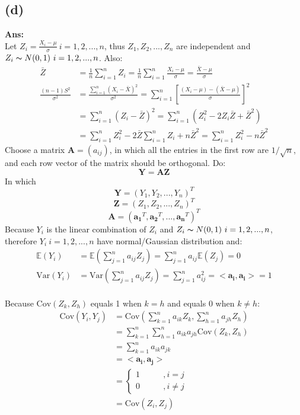 \documentclass[twoside]{homework}
\begin{document}
\subsection*{(d)}
\textbf{Ans:}\\
Let $Z_i = \frac{X_i -\mu}{\sigma}\ i=1,2,...,n$, thus $Z_1, Z_2,..., Z_n$ are independent and $Z_i\thicksim N(0,1)\ i=1,2,...,n$. Also:\\
\begin{equation}
    \begin{aligned}
    \bar{Z} &= \frac{1}{n}\sum_{i=1}^{n} Z_i = \frac{1}{n}\sum_{i=1}^{n} \frac{X_i -\mu}{\sigma} = \frac{\bar{X}-\mu}{\sigma}\\
    \frac{(n-1)S^2}{\sigma^2} &= \frac{\sum_{i=1}^{n} (X_i - \bar{X})^2}{\sigma^2} = \sum_{i=1}^{n} [\frac{ (X_i - \mu) - (\bar{X} - \mu)}{\sigma }]^2\\
    &= \sum_{i=1}^{n} (Z_i - \bar{Z})^2 = \sum_{i=1}^{n} (Z_i^2 - 2Z_i\bar{Z} + \bar{Z}^2)\\
    &= \sum_{i=1}^{n}Z_i^2 - 2\bar{Z}\sum_{i=1}^{n}Z_i + n\bar{Z}^2 = \sum_{i=1}^{n}Z_i^2 - n\bar{Z}^2
    \end{aligned}
\end{equation}
Choose a matrix $\bm{A} = (a_{ij})$, in which all the entries in the first row are $1/\sqrt{n}$, and each row vector of the matrix should be orthogonal. Do:\\
$$\bm{Y} = \bm{AZ}$$
In which $$\bm{Y} = (Y_1, Y_2,...,Y_n)^T$$ $$\bm{Z} = (Z_1, Z_2,...,Z_n)^T$$ $$\bm{A} = (\bm{a_1}^T, \bm{a_2}^T,...,\bm{a_n}^T)^T$$
Because $Y_i$ is the linear combination of $Z_i$ and $Z_i\thicksim N(0,1)\ i=1,2,...,n$, therefore $Y_i\ i=1,2,...,n$ have normal/Gaussian distribution and:
\begin{equation}
\begin{aligned}
\mathbb{E}(Y_i) &= \mathbb{E}(\sum_{j=1}^{n} a_{ij}Z_j) = \sum_{j=1}^{n} a_{ij}\mathbb{E}(Z_j) = 0\\
\mathrm{Var}(Y_i) &= \mathrm{Var}(\sum_{j=1}^{n} a_{ij}Z_j) = \sum_{j=1}^{n} a_{ij}^2 = <\bm{a_i}, \bm{a_i}> = 1
\end{aligned}
\end{equation}\\
Because $\mathrm{Cov}(Z_k, Z_h)$ equals 1 when $k=h$ and equals 0 when $k\neq h$:
\begin{equation}
    \begin{aligned}
    \mathrm{Cov}(Y_i, Y_j) &= \mathrm{Cov}(\sum_{k=1}^{n} a_{ik}Z_k, \sum_{h=1}^{n} a_{jh}Z_h) \\
    &= \sum_{k=1}^{n} \sum_{h=1}^{n} a_{ik} a_{jh} \mathrm{Cov}(Z_k, Z_h) \\
    &= \sum_{k=1}^{n} a_{ik} a_{jk}\\
    &= <\bm{a_i}, \bm{a_j}>\\
    &=
    \left\{  
             \begin{aligned}
             1\qquad&, i=j \\
             0\qquad&, i\neq j
             \end{aligned}
    \right. \\
    &= \mathrm{Cov}(Z_i, Z_j)
    \end{aligned}
\end{equation}\\
\end{document}
